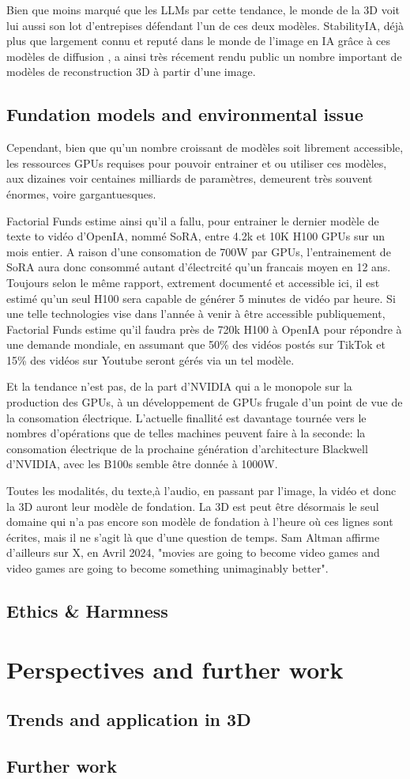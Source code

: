 Bien que moins marqué que les LLMs par cette tendance, le monde de la 3D voit lui aussi son lot d'entrepises défendant l'un de ces deux modèles. StabilityIA, déjà plus que largement connu et reputé dans le monde de l'image en IA grâce à ces modèles de diffusion \citep{esser2024scaling}, a ainsi très récement rendu public un nombre important de modèles de reconstruction 3D \cite{TripoSR2024 ,voleti2024sv3d} à partir d'une image. 


\subsection{Fundation models and environmental issue}
Cependant, bien que qu'un nombre croissant de modèles soit librement accessible, les ressources GPUs requises pour pouvoir entrainer et ou utiliser ces modèles, aux dizaines voir centaines milliards de paramètres, demeurent très souvent énormes, voire gargantuesques. 


Factorial Funds estime ainsi qu'il a fallu, pour entrainer le dernier modèle de texte to vidéo d'OpenIA, nommé SoRA, entre 4.2k et 10K H100 GPUs sur un mois entier. A raison d'une consomation de 700W par GPUs, l'entrainement de SoRA aura donc consommé autant d'électrcité qu'un francais moyen en 12 ans. Toujours selon le même rapport, extrement documenté et accessible ici, il est estimé qu'un seul H100 sera capable de générer 5 minutes de vidéo par heure. Si une telle technologies vise dans l'année à venir à être accessible publiquement, Factorial Funds estime qu'il faudra près de 720k H100 à OpenIA pour répondre à une demande mondiale, en assumant que 50\% des vidéos postés sur TikTok et 15\% des vidéos sur Youtube seront gérés via un tel modèle.

Et la tendance n'est pas, de la part d'NVIDIA qui a le monopole sur la production des GPUs, à un développement de GPUs frugale d'un point de vue de la consomation électrique. L'actuelle finallité est davantage tournée vers le nombres d'opérations que de telles machines peuvent faire à la seconde: la consomation électrique de la prochaine génération d'architecture Blackwell d'NVIDIA, avec les B100s semble être donnée à 1000W. 

Toutes les modalités, du texte,à l'audio, en passant par l'image, la vidéo et donc la 3D auront leur modèle de fondation. La 3D est peut être désormais le seul domaine qui n'a pas encore son modèle de fondation à l'heure où ces lignes sont écrites, mais il ne s'agit là que d'une question de temps. Sam Altman affirme d'ailleurs sur X, en Avril 2024, "movies are going to become video games and video games are going to become something unimaginably better". 

\subsection{Ethics & Harmness}

\section{Perspectives and further work}
\subsection{Trends and application in 3D}
\subsection{Further work}

